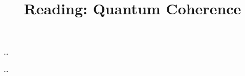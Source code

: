 \documentclass[12pt]{article}
\title{Reading: Quantum Coherence}
\date{}
\begin{document}
\sffamily

\maketitle

\noindent \dots 

\vfill



\begin{thebibliography}{}

\item \dots 

\end{thebibliography}
\end{document}
